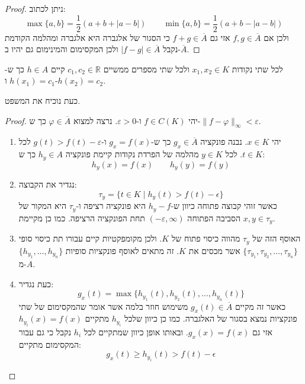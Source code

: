 \documentclass{tstextbook}
\begin{document}
\begin{proof}
ניתן לכתוב:
$$\operatorname*{max}\{a,b\}={\frac{1}{2}}(a+b+|a-b|)\qquad \operatorname*{min}\{a,b\}={\frac{1}{2}}(a+b-|a-b|)$$
ולכן אם \(f,g \in \overline{A}\) אזי גם \(f+g \in \overline{A}\) כי הסגור של אלגברה היא אלגברה ומהלמה הקודמת נקבל \(\lvert f-g \rvert\in \overline{A}\) ולכן המקסימום והמינימום גם יהיו ב-\(\overline{A}\).

\end{proof}
\begin{lemma}
לכל שתי נקודות \(x_{1},x_{2} \in K\) ולכל שתי מספרים ממשיים \(c_{1},c_{2} \in \mathbb{R}\) קיים \(h \in A\) כך ש-\(h(x_{1})=c_{1}\) ו-\(h(x_{2})=c_{2}\).

\end{lemma}
כעת נוכיח את המשפט.

\begin{proof}
יהי \(f \in C(K)\) ו-\(\varepsilon> 0\). נרצה למצוא \(\varphi \in \overline{A}\) כך ש-\(\lVert f-\varphi \rVert_{\infty}<\varepsilon\).

  \begin{enumerate}
    \item יהי \(x \in K\). נבנה פונקציה \(g_{x}\in \overline{A}\) כך ש-\(g_{x}=f(x)\) ו-\(g(t)>f(t)-\varepsilon\) לכל \(t \in K\). לכל \(y\in K\) מהלמה של הפרדת נקודות קיימת פונקציה \(h_{y}\in A\) כך ש: 
$$h_{y}(x)=f(x)\qquad h_{y}(y)=f(y)$$


    \item נגדיר את הקבוצה: 
$$\tau_{y}=\{t\in K\mid h_{y}(t)>f(t)-\epsilon\}$$
כאשר זוהי קבוצה פתוחה כיוון ש-\(h_{y}-f\) היא פונקציה רציפה ו-\(\tau_{y}\) היא המקור של הסביבה הפתוחה \((-\varepsilon,\infty)\) תחת הפונקציה הרציפה. כמו כן מקיימת \(x ,y \in \tau_{y}\).


    \item האוסף הזה של \(\tau_{y}\) מהווה כיסוי פתוח של \(K\). ולכן מקומפקטיות קיים עבורו תת כיסוי סופי \(\{ \tau_{y_{1}},\tau_{y_{2}},\dots,\tau_{y_{n}} \}\) אשר מכסים את \(K\). זה מתאים לאוסף פונקציות סופיות \(\{ h_{y_{1}},\dots,h_{y_{n}} \}\) מ-\(A\). 


    \item כעת נגדיר: 
$$g_{x}(t)=\operatorname*{max}\{h_{y_{1}}(t),h_{y_{2}}(t),\ldots,h_{y_{n}}(t)\}$$
כאשר זה מקיים \(g_{x}(t)\in \overline{A}\) משימוש חוזר בלמה אשר אומר שהמקסימום של שתי פונקציות נמצא בסגור של האלגברה. כמו כן כיוון שלכל \(h_{y_{i}}\) מתקיים \(h_{y_{i}}(x)=f(x)\) אזי גם \(g_{x}(x)=f(x)\). ובאותו אופן כיוון שמתקיים לכל \(h_{i}\) נקבל כי גם עבור המקסימום מתקיים:
$$g_{x}(t)\geq h_{y_{i}}(t)>f(t)-\epsilon$$



\end{enumerate}
\end{proof}
\end{document}
